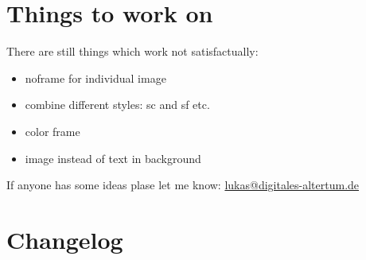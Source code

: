 \documentclass[a4paper,
10pt,
english
]{ltxdoc}
\begin{document}
\clearpage
\section{Things to work on}
There are still things which work not satisfactually:
\begin{itemize}
	\item  noframe for individual image
\item  combine different styles: sc and sf etc.
\item  color frame
\item  image instead of text in background
\end{itemize}
If anyone has some ideas plase let me know: \href{mailto:lukas@digitales-altertum.de}{lukas@digitales-altertum.de}

\section{Changelog}
\PrintRevisions
\end{document}
